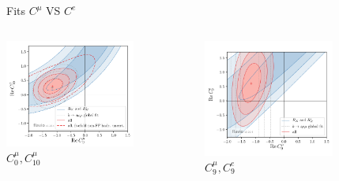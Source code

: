 \documentclass[9pt,usenames,dvipsnames]{beamer}
\begin{document}
\begin{frame}{Fits $ C^\mu$  VS $C^e$ }
	\begin{columns}[c]
		\begin{center}
			\includegraphics[width=0.7\textwidth]{./assets/c9_rk} \\ {\tiny$ C_0^\mu , C_{10}^\mu$}
		\end{center}
			\begin{center}
				\includegraphics[width= 0.7\textwidth]{./assets/c9_mue} \\ {\tiny$ C_9^\mu , C_{9}^e$}
			\end{center}	
		\begin{center}

\end{center}
\end{columns}
\end{frame}
\end{document}
